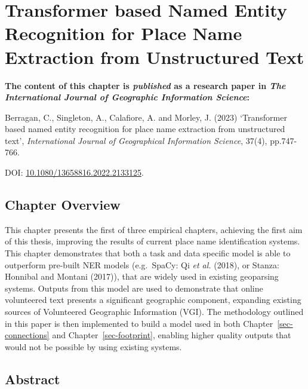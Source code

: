 \documentclass[
  letterpaper,
  11pt,
  english,
  onehalfspacing,
  headsepline]{MastersDoctoralThesis}
\begin{document}

\hypertarget{sec-transformer}{%
\chapter{Transformer based Named Entity Recognition for Place Name
Extraction from Unstructured Text}\label{sec-transformer}}


\textbf{The content of this chapter is \emph{published} as a research
paper in \emph{The International Journal of Geographic Information
Science}:}

Berragan, C., Singleton, A., Calafiore, A. and Morley, J. (2023)
`Transformer based named entity recognition for place name extraction
from unstructured text', \emph{International Journal of Geographical
Information Science}, 37(4), pp.747-766.

DOI: \url{10.1080/13658816.2022.2133125}.

\hypertarget{chapter-overview}{%
\section*{Chapter Overview}\label{chapter-overview}}


This chapter presents the first of three empirical chapters, achieving
the first aim of this thesis, improving the results of current place
name identification systems. This chapter demonstrates that both a task
and data specific model is able to outperform pre-built NER models
(e.g.~SpaCy: Qi \emph{et al.} (2018), or Stanza: Honnibal and Montani
(2017)), that are widely used in existing geoparsing systems. Outputs
from this model are used to demonstrate that online volunteered text
presents a significant geographic component, expanding existing sources
of Volunteered Geographic Information (VGI). The methodology outlined in
this paper is then implemented to build a model used in both
Chapter~\ref{sec-connections} and Chapter~\ref{sec-footprint}, enabling
higher quality outputs that would not be possible by using existing
systems.

\hypertarget{abstract-1}{%
\section*{Abstract}\label{abstract-1}}
\end{document}

